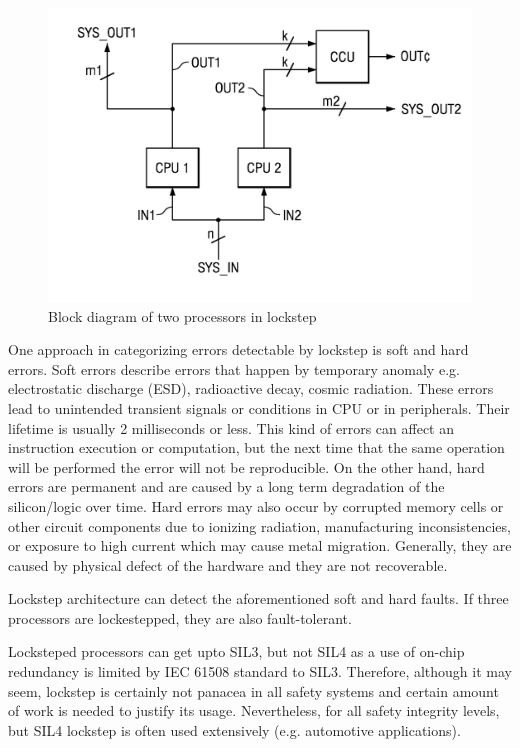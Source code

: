 \begin{figure}[H]

      \centering
      \includegraphics[width=0.9\linewidth]{images/patent_not_delayed.png}
      \caption{Block diagram of two processors in lockstep}
      \label{fig:patent_not_delayed}
    
\end{figure}

One approach in categorizing errors detectable by lockstep is soft and hard errors. Soft errors describe errors that happen by temporary anomaly e.g. electrostatic discharge (ESD), radioactive decay, cosmic radiation. These errors lead to unintended transient signals or conditions in CPU or in peripherals. Their lifetime is usually 2 milliseconds or less. This kind of errors can affect an instruction execution or computation, but
the next time that the same operation will be performed the error will not be reproducible. On the other hand, hard errors are permanent and are caused by a
long term degradation of the silicon/logic over time. Hard errors may also occur
by corrupted memory cells or other circuit components due to ionizing radiation,
manufacturing inconsistencies, or exposure to high current which may cause
metal migration. Generally, they are caused by physical defect of the hardware and
they are not recoverable.

Lockstep architecture can detect the aforementioned soft and hard faults. If three processors are lockestepped, they are also fault-tolerant. \citep{lockstep_analysis}

Locksteped processors can get upto SIL3, but not SIL4 as a use of on-chip redundancy is limited by IEC 61508 standard to SIL3. Therefore, although it may seem, lockstep is certainly not panacea in all safety systems and certain amount of work is needed to justify its usage. Nevertheless, for all safety integrity levels, but SIL4 lockstep is often used extensively (e.g. automotive applications). \citep{ipavic_lockstep}

